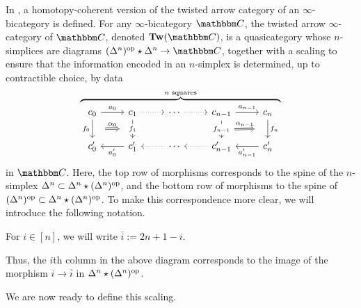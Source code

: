 \documentclass[main.tex]{subfiles}
\begin{document}
In \cite{garcia2020enhanced}, a homotopy-coherent version of the twisted arrow category of an $\infty$-bicategory is defined. For any $\infty$-bicategory $\CC$, the twisted arrow $\infty$-category of $\CC$, denoted $\Tw(\CC)$, is a quasicategory whose $n$-simplices are diagrams $(\Delta^{n})\op \star \Delta^{n} \to \CC$, together with a scaling to ensure that the information encoded in an $n$-simplex is determined, up to contractible choice, by data
\begin{equation*}
  \overbrace{
    \begin{tikzcd}[ampersand replacement=\&]
      c_{0}
      \arrow[r, "a_{0}"]
      \arrow[d, "f_{0}"{swap}, ""{name=L1}]
      \& c_{1}
      \arrow[d, "f_{1}"{description}, ""{swap, name=R1}]
      \arrow[r, dotted]
      \& \cdots
      \arrow[r, dotted]
      \& c_{n-1}
      \arrow[r, "a_{n-1}"]
      \arrow[d, "f_{n-1}"{description}, ""{name=Ln}]
      \& c_{n}
      \arrow[d, "f_{n}", ""{swap, name=Rn}]
      \\
      c'_{0}
      \& c'_{1}
      \arrow[l, "a'_{0}"]
      \& \cdots
      \arrow[l, dotted]
      \& c'_{n-1}
      \arrow[l, dotted]
      \& c'_{n}
      \arrow[l, "a'_{n-1}"]
      \arrow[from=L1, to=R1, Rightarrow, "\alpha_{0}", shorten=2ex]
      \arrow[from=Ln, to=Rn, Rightarrow, "\alpha_{n-1}", shorten=2ex]
    \end{tikzcd}
  }^{n\text{ squares}}
\end{equation*}
in $\CC$. Here, the top row of morphisms corresponds to the spine of the $n$-simplex $\Delta^{n} \subset \Delta^{n} \star (\Delta^{n})^{\mathrm{op}}$, and the bottom row of morphisms to the spine of $(\Delta^{n})^{\mathrm{op}} \subset \Delta^{n} \star (\Delta^{n})^{\mathrm{op}}$. To make this correspondence more clear, we will introduce the following notation.

\begin{notation}
  For $i \in [n]$, we will write $\overline{i} := 2n+1-i$.
\end{notation}

Thus, the $i$th column in the above diagram corresponds to the image of the morphism $i \to \overline{i}$ in $\Delta^{n} \star (\Delta^{n})^{\mathrm{op}}$.

We are now ready to define this scaling.
\end{document}
